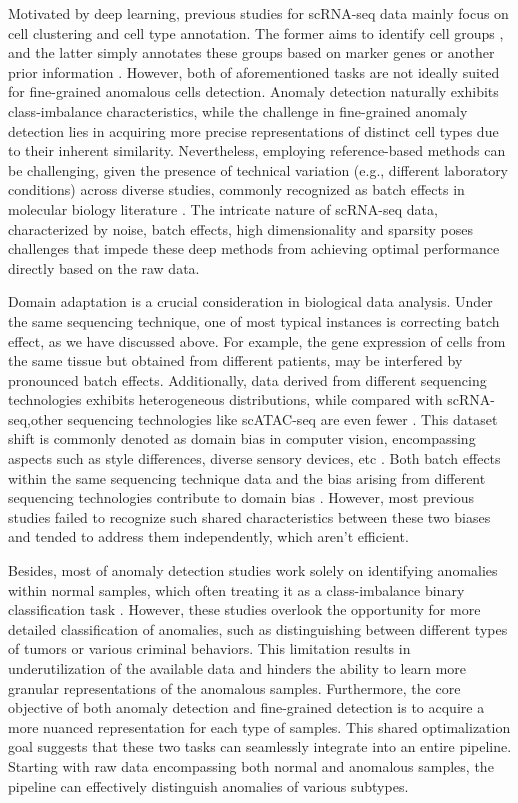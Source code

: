 \documentclass{article}
\begin{document}
Motivated by deep learning, previous studies for scRNA-seq data mainly focus on cell 
clustering and cell type annotation. The former aims to identify cell groups \cite{sczi-Desk,scCNC},
and the latter simply annotates these groups based on marker genes or another prior information \cite{ItClust,scArches}. 
However, both of aforementioned tasks are not ideally suited for fine-grained anomalous cells detection. 
Anomaly detection naturally exhibits class-imbalance characteristics, while the challenge 
in fine-grained anomaly detection lies in acquiring more precise representations of distinct cell types 
due to their inherent similarity. Nevertheless, employing reference-based methods can be challenging, given the presence of 
technical variation (e.g., different laboratory conditions) across diverse studies, 
commonly recognized as batch effects in molecular biology literature \cite{Polyphony}. 
The intricate nature of scRNA-seq data, characterized by noise, batch effects, high 
dimensionality and sparsity \cite{dands} poses challenges that impede these deep 
methods from achieving optimal performance directly based on the raw data.

Domain adaptation is a crucial consideration in biological data analysis. Under the same sequencing technique, one of most 
typical instances is correcting batch effect, as we have discussed above. For example, the gene expression of cells from 
the same tissue but obtained from different patients, may be interfered by pronounced batch effects. 
Additionally, data derived from different sequencing technologies exhibits heterogeneous distributions, while 
compared with scRNA-seq,other sequencing technologies like scATAC-seq are even fewer \cite{RNAmore}.
This dataset shift is commonly denoted as domain bias in computer vision, encompassing aspects 
such as style differences, diverse sensory devices, etc \cite{domainada}.
Both batch effects within the same sequencing technique data and the bias arising from different 
sequencing technologies contribute to domain bias \cite{ACE}. However, most previous studies failed to 
recognize such shared characteristics between these two biases and tended to address them 
independently, which aren't efficient.

Besides, most of anomaly detection studies work solely on identifying anomalies within normal 
samples, which often treating it as a class-imbalance binary classification task \cite{OA}. 
However, these studies overlook the opportunity for more detailed classification of 
anomalies, such as distinguishing between different types of tumors or various criminal 
behaviors. This limitation results in underutilization of the available data and hinders 
the ability to learn more granular representations of the anomalous samples. 
Furthermore, the core objective of both anomaly detection and fine-grained detection is to 
acquire a more nuanced representation for each type of samples. This shared optimalization 
goal suggests that these two tasks can seamlessly integrate into an entire pipeline. 
Starting with raw data encompassing both normal and anomalous samples, the pipeline can 
effectively distinguish anomalies of various subtypes.
\end{document}
